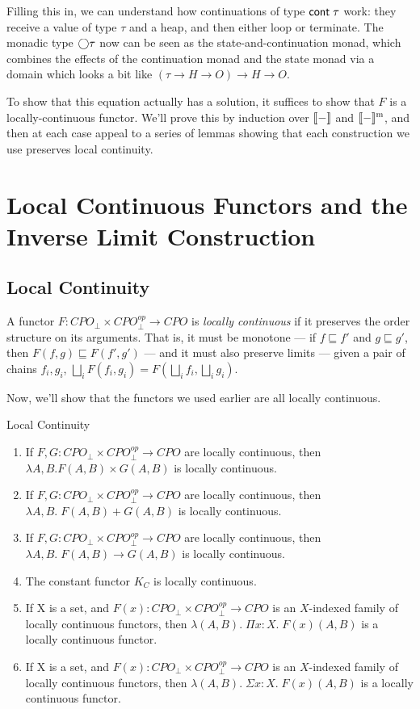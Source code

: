 Filling this in, we can understand how continuations of type
$\mathsf{cont}\;{\tau}$ work: they receive a value of type $\tau$ and a heap,
and then either loop or terminate. The monadic type $\bigcirc{\tau}$ now
can be seen as the state-and-continuation monad, which combines the
effects of the continuation monad and the state monad via a domain 
which looks a bit like $(\tau \to H \to O) \to H \to O$. 

To show that this equation actually has a solution, it suffices to 
show that $F$ is a locally-continuous functor. We'll prove this by 
induction over $[\![{-}]\!]$ and $[\![{-}]\!]^{\mathrm{m}}$, and then at each
case appeal to a series of lemmas showing that each construction we
use preserves local continuity. 

\section{Local Continuous Functors and the Inverse Limit Construction}

\subsection{Local Continuity}

A functor $F : CPO_\bot \times CPO^{op}_\bot \to CPO$ is \emph{locally
  continuous} if it preserves the order structure on its arguments.
That is, it must be monotone --- if $f \sqsubseteq f'$ and $g
\sqsubseteq g'$, then $F(f, g) \sqsubseteq F(f', g')$ --- and it
must also preserve limits --- given a pair of chains $f_i, g_i$, 
$\bigsqcup_i F(f_i, g_i) = F(\bigsqcup_i f_i, \bigsqcup_i g_i)$. 

Now, we'll show that the functors we used earlier are all locally 
continuous. 

\begin{lemma}{Local Continuity}
\begin{enumerate}
\item If $F,G : CPO_\bot \times CPO^{op}_\bot \to CPO$ are locally continuous,
      then $\lambda A,B. F(A,B) \times G(A,B)$ is locally continuous.  
\item If $F,G : CPO_\bot \times CPO^{op}_\bot \to CPO$ are locally continuous,
      then $\lambda A,B.\; F(A,B) + G(A,B)$ is locally continuous.  
\item If $F,G : CPO_\bot \times CPO^{op}_\bot \to CPO$ are locally continuous,
      then $\lambda A,B.\;F(A,B) \to G(A,B)$ is locally continuous.  
\item The constant functor $K_C$ is locally continuous. 
\item If X is a set, and $F(x) : CPO_\bot \times CPO^{op}_\bot \to CPO$ is an
      $X$-indexed family of locally continuous functors, then 
      $\lambda (A,B).\; \Pi x:X.\;F(x)(A,B)$ is a locally continuous functor. 
\item If X is a set, and $F(x) : CPO_\bot \times CPO^{op}_\bot \to CPO$ is an
      $X$-indexed family of locally continuous functors, then 
      $\lambda (A,B).\;\Sigma x:X.\;F(x)(A,B)$ is a locally continuous functor. 
\end{enumerate}
\end{lemma}
 
